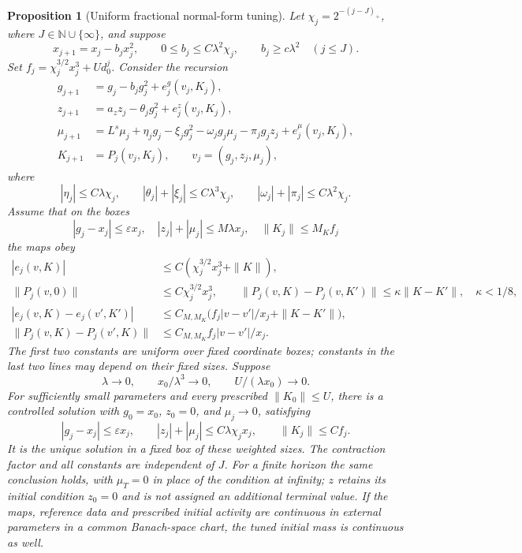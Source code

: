 \documentclass[11pt]{article}
\newtheorem{proposition}{Proposition}[section]
\begin{document}
\begin{proposition}[Uniform fractional normal-form tuning]
\label{frac:prop:recursion}
Let \(\chi_j=2^{-(j-J)_+}\), where
\(J\in\mathbb N\cup\{\infty\}\), and suppose
\[
 x_{j+1}=x_j-b_jx_j^2,\qquad
 0\le b_j\le C\lambda^2\chi_j,\qquad
 b_j\ge c\lambda^2\quad(j\le J).
\]
Set \(f_j=\chi_j^{3/2}x_j^3+Ud_0^j\).
Consider the recursion
\begin{align*}
 g_{j+1}&=g_j-b_jg_j^2+e_j^g(v_j,K_j),\\
 z_{j+1}&=a_z z_j-\theta_jg_j^2+e_j^z(v_j,K_j),\\
 \mu_{j+1}&=L^s\mu_j+\eta_jg_j-\xi_jg_j^2
       -\omega_jg_j\mu_j-\pi_jg_jz_j+e_j^\mu(v_j,K_j),\\
 K_{j+1}&=P_j(v_j,K_j),\qquad v_j=(g_j,z_j,\mu_j),
\end{align*}
where
\[
 |\eta_j|\le C\lambda\chi_j,\qquad
 |\theta_j|+|\xi_j|\le C\lambda^3\chi_j,\qquad
 |\omega_j|+|\pi_j|\le C\lambda^2\chi_j.
\]
Assume that on the boxes
\[
 |g_j-x_j|\le\varepsilon x_j,\quad
 |z_j|+|\mu_j|\le M\lambda x_j,\quad
 \|K_j\|\le M_K f_j
\]
the maps obey
\begin{align*}
 |e_j(v,K)|&\le C(\chi_j^{3/2}x_j^3+\|K\|),\\
 \|P_j(v,0)\|&\le C\chi_j^{3/2}x_j^3,\qquad
 \|P_j(v,K)-P_j(v,K')\|\le\kappa\|K-K'\|,
                    \quad \kappa<1/8,\\
 |e_j(v,K)-e_j(v',K')|
   &\le C_{M,M_K}\bigl(f_j|v-v'|/x_j+\|K-K'\|\bigr),\\
 \|P_j(v,K)-P_j(v',K)\|
   &\le C_{M,M_K}f_j|v-v'|/x_j.
\end{align*}
The first two constants are uniform over fixed coordinate boxes;
constants in the last two lines may depend on their fixed sizes.
Suppose
\[
 \lambda\to0,\qquad x_0/\lambda^3\to0,\qquad
 U/(\lambda x_0)\to0.
\]
For sufficiently small parameters and every prescribed
\(\|K_0\|\le U\), there is a controlled solution with
\(g_0=x_0\), \(z_0=0\), and \(\mu_j\to0\), satisfying
\[
 |g_j-x_j|\le\varepsilon x_j,\qquad
 |z_j|+|\mu_j|\le C\lambda\chi_j x_j,\qquad
 \|K_j\|\le C f_j.
\]
It is the unique solution in a fixed box of these weighted sizes.
The contraction factor and all constants are independent of \(J\).
For a finite horizon the same conclusion holds, with \(\mu_T=0\)
in place of the condition at infinity; \(z\) retains its initial
condition \(z_0=0\) and is not assigned an additional terminal value.
If the maps, reference data and prescribed initial activity are
continuous in external parameters in a common Banach-space chart,
the tuned initial mass is continuous as well.
\end{proposition}
\end{document}
